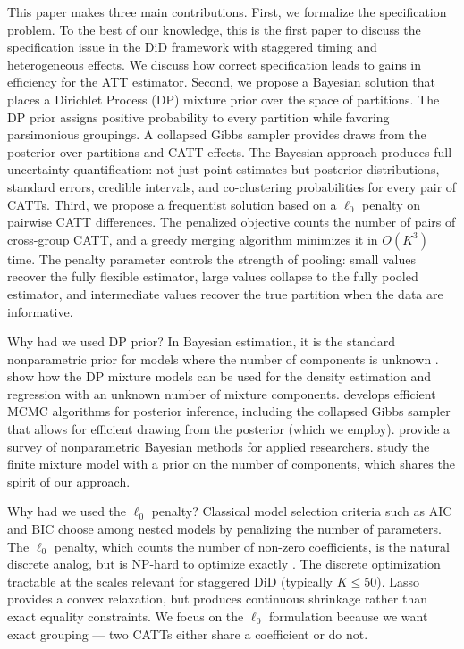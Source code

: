 \documentclass[margin=3in, 12pt]{article}
\newcommand{\1}{\mathbbm{1}}
\begin{document}
This paper makes three main contributions. First, we formalize the specification problem. To the best of our knowledge, this is the first paper to discuss the specification issue in the DiD framework with staggered timing and heterogeneous effects. We discuss how correct specification leads to gains in efficiency for the ATT estimator. Second, we propose a Bayesian solution that places a Dirichlet Process (DP) mixture prior over the space of partitions. The DP prior assigns positive probability to every partition while favoring parsimonious groupings. A collapsed Gibbs sampler provides draws from the posterior over partitions and CATT effects. The Bayesian approach produces full uncertainty quantification: not just point estimates but posterior distributions, standard errors, credible intervals, and
co-clustering probabilities for every pair of CATTs. Third, we propose a frequentist solution based on a $\ell_0$ penalty on pairwise CATT differences. The penalized objective counts the number of pairs of cross-group CATT, and a greedy merging algorithm minimizes it in $O(K^3)$ time. The penalty parameter controls the strength of pooling: small values recover the fully flexible estimator, large values collapse
to the fully pooled estimator, and intermediate values recover the true partition when the data are informative.

Why had we used DP prior? In Bayesian estimation, it is the standard nonparametric prior for models where the number of components is unknown \citep{ferguson1973, antoniak1974}. \citet{escobar1995} show how the DP mixture models can be used for the density estimation and regression with an unknown number of mixture components. \citet{neal2000} develops efficient MCMC algorithms for posterior inference,
including the collapsed Gibbs sampler that allows for efficient drawing from the posterior (which we employ). \citet{muller2004} provide
a survey of nonparametric Bayesian methods for applied researchers. \citet{miller2018} study the finite mixture model with a prior on the number of components, which shares the spirit of our approach.

Why had we used the $\ell_0$ penalty? Classical model selection criteria such as AIC \citep{akaike1974} and BIC \citep{schwarz1978} choose among nested models by penalizing the number of parameters. The $\ell_0$ penalty, which counts the number of non-zero coefficients, is the natural discrete analog, but is NP-hard to optimize exactly \citep{fan2001}. The discrete optimization tractable at the scales relevant for staggered DiD (typically $K \leq 50$). Lasso \citep{tibshirani1996} provides a convex relaxation, but produces continuous shrinkage rather than exact equality constraints.
We focus on the $\ell_0$ formulation because we want exact grouping --- two CATTs either share a coefficient or do not. 
\end{document}
